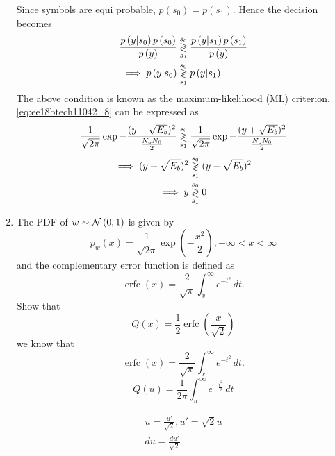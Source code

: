 \documentclass[10pt, a4paper]{article}
\providecommand{\brak}[1]{\ensuremath{\left(#1\right)}}
\begin{document}
\begin{enumerate}
Since symbols are equi probable,  $p\brak{s_0} =  p\brak{s_1}$.  Hence the decision becomes
\begin{align}
    \frac{p\brak{y|s_0}p\brak{s_0}}{p\brak{y}} &\dec{s_0}{s_1}  \frac{p\brak{y|s_1}p\brak{s_1}}{p\brak{y}}
    \label{eq:ee18btech11042_7}
\\
    \implies p\brak{y|s_0} &\dec{s_0}{s_1} p\brak{y|s_1}
    \label{eq:ee18btech11042_8}
\end{align}
The above condition is known as the maximum-likelihood (ML) criterion.      \eqref{eq:ee18btech11042_8}
can be expressed as
{\small
\begin{align}
    \frac{1}{\sqrt{2\pi}} \exp{-\frac{(y-\sqrt{E_b})^2}{\frac{N_oN_0}{2}}}  \overset{s_0}{\underset{s_1}{\gtrless}}   
    \frac{1}{\sqrt{2\pi}} \exp{-\frac{(y+\sqrt{E_b})^2}{\frac{N_oN_0}{2}}}
    \label{eq:ee18btech11042_9}
\end{align}
}
\begin{align}
     \implies (y+\sqrt{E_b})^2 &\overset{s_0}{\underset{s_1}{\gtrless}} (y - \sqrt{E_b})^2
     \label{eq:ee18btech11042_10}
\\
    \implies y &\overset{s_0}{\underset{s_1}{\gtrless}} 0
    \label{eq:ee18btech11042_11}
\end{align}




\item The PDF of $w \sim \mathcal{N}\left(0,1\right)$ is given by
%
\begin{equation}
p_{w}(x) = \frac{1}{\sqrt{2\pi}}\exp\brak{-\frac{x^2}{2}}, -\infty < x < \infty
\end{equation}
and the complementary error function is defined as
\begin{equation}
\operatorname {erfc} (x)={\frac {2}{\sqrt {\pi }}}\int _{x}^{\infty }e^{-t^{2}}\,dt.
\end{equation}
%
Show that 
\begin{equation}
Q(x) = \frac{1}{2}\operatorname {erfc}\left({\frac  {x}{{\sqrt  {2}}}}\right)
\end{equation}
\solution 
we know that
\begin{equation}
\operatorname {erfc} (x)={\frac {2}{\sqrt {\pi }}}\int _{x}^{\infty }e^{-t^{2}}\,dt.
\end{equation}
\begin{equation}
Q(u) = \frac{1}{2\pi}\int^{\infty}_{u}e^{-\frac{t^2}{2}}\,dt
\end{equation}

\begin{align}
 u=\frac{u'}{\sqrt{2}}  ,u'=\sqrt{2}u\\
 du=\frac{du'}{\sqrt{2}}
\end{align}


\end{enumerate}
\end{document}
